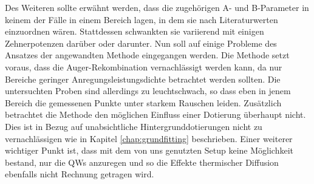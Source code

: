 \noindent 
Des Weiteren sollte erwähnt werden, dass die zugehörigen A- und B-Parameter in keinem der Fälle in einem Bereich lagen, in dem sie nach Literaturwerten einzuordnen wären. Stattdessen schwankten sie variierend mit einigen Zehnerpotenzen darüber oder darunter. 
Nun soll auf einige Probleme des Ansatzes der angewandten Methode eingegangen werden. 
Die Methode setzt voraus, dass die Auger-Rekombination vernachlässigt werden kann, da nur Bereiche geringer Anregungsleistungsdichte betrachtet werden sollten. Die untersuchten Proben sind allerdings zu leuchtschwach, so dass eben in jenem Bereich die gemessenen Punkte unter starkem Rauschen leiden. Zusätzlich betrachtet die Methode den möglichen Einfluss einer Dotierung überhaupt nicht. Dies ist in Bezug auf unabsichtliche Hintergrunddotierungen nicht zu vernachlässigen wie in Kapitel \ref{chap:grundfitting} beschrieben. Einer weiterer wichtiger Punkt ist, dass mit dem von uns genutzten Setup keine Möglichkeit bestand, nur die QWs anzuregen und so die Effekte thermischer Diffusion ebenfalls nicht Rechnung getragen wird. 


